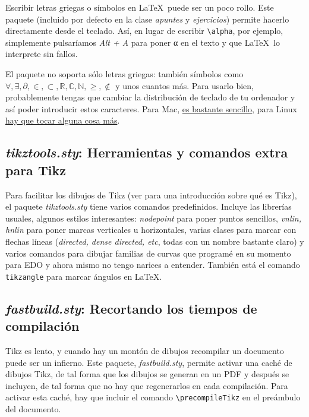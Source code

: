 Escribir letras griegas o símbolos en \LaTeX\ puede ser un poco rollo. Este paquete (incluido por defecto en la clase \textit{apuntes} y \textit{ejercicios}) permite hacerlo directamente desde el teclado. Así, en lugar de escribir \verb|\alpha|, por ejemplo, simplemente pulsaríamos \textit{Alt + A} para poner α en el texto y que \LaTeX\ lo interprete sin fallos.

El paquete no soporta sólo letras griegas: también símbolos como $∀, ∃, ∂, ∈, ⊂, ℝ, ℂ, ℕ, ≥, ∉$ y unos cuantos más. Para usarlo bien, probablemente tengas que cambiar la distribución de teclado de tu ordenador y así poder introducir estos caracteres. Para Mac, \href{https://github.com/gjulianm/MathUnicode}{es bastante sencillo}, para Linux \href{https://github.com/VicdeJuan/Apuntes/tree/master/Cosas%20guays%20LaTeX/ConfiguracionTeclado}{hay que tocar alguna cosa más}.

\subsection{\textit{tikztools.sty}: Herramientas y comandos extra para Tikz}
\label{sec:Tikztools}

Para facilitar los dibujos de Tikz (ver  para una introducción sobre qué es Tikz), el paquete \textit{tikztools.sty} tiene varios comandos predefinidos. Incluye las librerías usuales, algunos estilos interesantes: \textit{nodepoint} para poner puntos sencillos, \textit{vnlin, hnlin} para poner marcas verticales u horizontales, varias clases para marcar con flechas líneas (\textit{directed, dense directed, etc}, todas con un nombre bastante claro) y varios comandos para dibujar familias de curvas que programé en su momento para EDO y ahora mismo no tengo narices a entender. También está el comando \texttt{tikzangle} para marcar ángulos en LaTeX.

\subsection{\textit{fastbuild.sty}: Recortando los tiempos de compilación}
\label{sec:fastbuild}

Tikz es lento, y cuando hay un montón de dibujos recompilar un documento puede ser un infierno. Este paquete, \textit{fastbuild.sty}, permite activar una caché de dibujos Tikz, de tal forma que los dibujos se generan en un PDF y después se incluyen, de tal forma que no hay que regenerarlos en cada compilación. Para activar esta caché, hay que incluir el comando \verb|\precompileTikz| en el preámbulo del documento.

